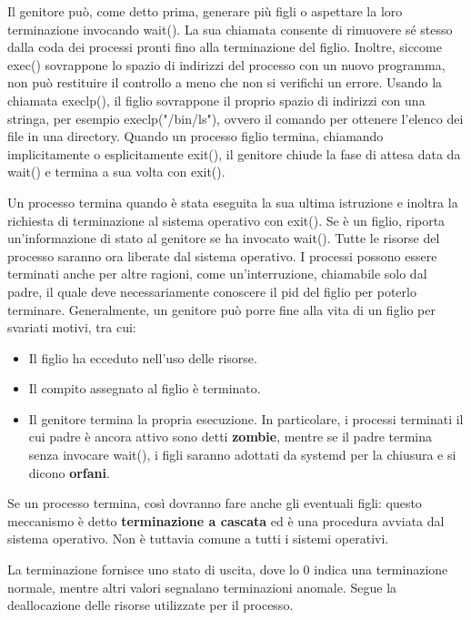 Il genitore può, come detto prima, generare più figli o aspettare la loro terminazione invocando wait(). La sua chiamata consente di rimuovere sé stesso dalla coda dei processi pronti fino alla terminazione del figlio. Inoltre, siccome exec() sovrappone lo spazio di indirizzi del processo con un nuovo programma, non può restituire il controllo a meno che non si verifichi un errore. Usando la chiamata execlp(), il figlio sovrappone il proprio spazio di indirizzi con una stringa, per esempio execlp("/bin/ls"), ovvero il comando per ottenere l'elenco dei file in una directory. Quando un processo figlio termina, chiamando implicitamente o esplicitamente exit(), il genitore chiude la fase di attesa data da wait() e termina a sua volta con exit().\newline

\noindent Un processo termina quando è stata eseguita la sua ultima istruzione e inoltra la richiesta di terminazione al sistema operativo con exit().
Se è un figlio, riporta un'informazione di stato al genitore se ha invocato wait(). Tutte le risorse del processo saranno ora liberate dal sistema operativo.
I processi possono essere terminati anche per altre ragioni, come un'interruzione, chiamabile solo dal padre, il quale deve necessariamente conoscere il pid del figlio per poterlo terminare. Generalmente, un genitore può porre fine alla vita di un figlio per svariati motivi, tra cui: \begin{itemize}
	\item Il figlio ha ecceduto nell'uso delle risorse.
	\item Il compito assegnato al figlio è terminato.
	\item Il genitore termina la propria esecuzione. In particolare, i processi terminati il cui padre è ancora attivo sono detti \textbf{zombie}, mentre se il padre termina senza invocare wait(), i figli saranno adottati da systemd per la chiusura e si dicono \textbf{orfani}.
\end{itemize}
\noindent Se un processo termina, così dovranno fare anche gli eventuali figli: questo meccanismo è detto \textbf{terminazione a cascata} ed è una procedura avviata dal sistema operativo. Non è tuttavia comune a tutti i sistemi operativi.\par
La terminazione fornisce uno stato di uscita, dove lo 0 indica una terminazione normale, mentre altri valori segnalano terminazioni anomale. Segue la deallocazione delle risorse utilizzate per il processo.

%

